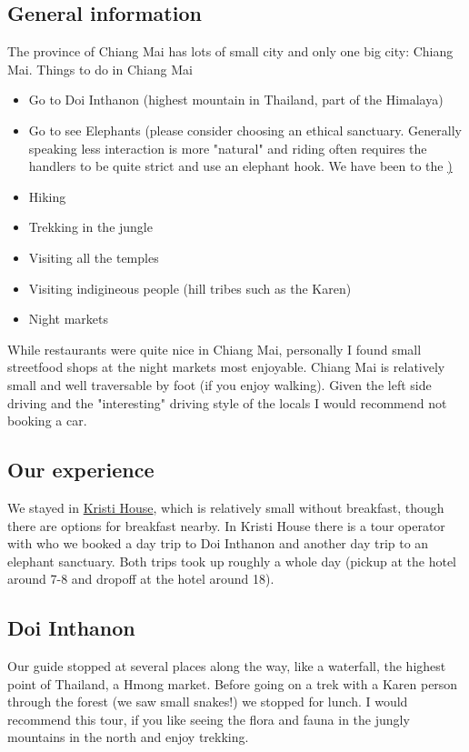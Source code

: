 \documentclass[11pt,a4paper,sans,english]{article}
\begin{document}
\subsection{General information}
The province of Chiang Mai has lots of small city and only one big city: Chiang Mai. 
Things to do in Chiang Mai
\begin{itemize}
	\itemsep-0.5em 
	\item Go to Doi Inthanon (highest mountain in Thailand, part of the Himalaya)
	\item Go to see Elephants (please consider choosing an ethical sanctuary. Generally speaking less interaction is more "natural" and riding often requires the handlers to be quite strict and use an elephant hook. We have been to the \href{https://www.elephantdreamproject.com/{elephant dream project}})
	\item Hiking
	\item Trekking in the jungle
	\item Visiting all the temples
	\item Visiting indigineous people (hill tribes such as the Karen)
	\item Night markets
\end{itemize}
While restaurants were quite nice in Chiang Mai, personally I found small streetfood shops at the night markets most enjoyable. Chiang Mai is relatively small and well traversable by foot (if you enjoy walking). Given the left side driving and the "interesting" driving style of the locals I would recommend not booking a car.
\subsection{Our experience}
We stayed in \href{https://www.booking.com/hotel/th/kristi-house-echiiyngaihm1.de.html}{Kristi House}, which is relatively small without breakfast, though there are options for breakfast nearby. In Kristi House there is a tour operator with who we booked a day trip to Doi Inthanon and another day trip to an elephant sanctuary.
Both trips took up roughly a whole day (pickup at the hotel around 7-8 and dropoff at the hotel around 18). 
\subsection{Doi Inthanon} 
Our guide stopped at several places along the way, like a waterfall, the highest point of Thailand, a Hmong market. Before going on a trek with a Karen person through the forest (we saw small snakes!) we stopped for lunch.
I would recommend this tour, if you like seeing the flora and fauna in the jungly mountains in the north and enjoy trekking.
\end{document}
